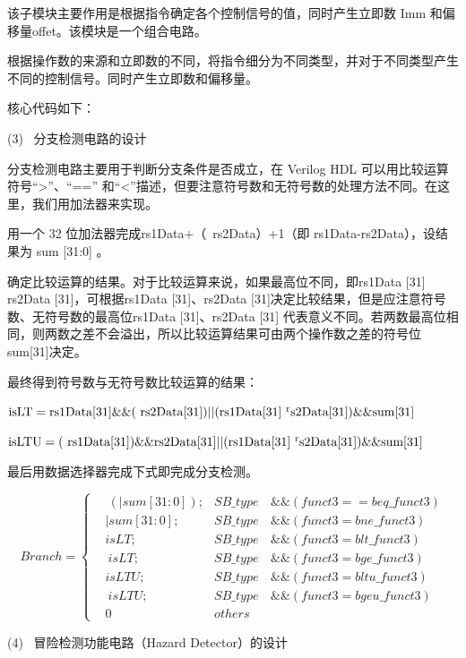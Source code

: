 \documentclass{../source/Experiment}
\begin{document}
        该子模块主要作用是根据指令确定各个控制信号的值，同时产生立即数 Imm 和偏移量offet。该模块是一个组合电路。

        根据操作数的来源和立即数的不同，将指令细分为不同类型，并对于不同类型产生不同的控制信号。同时产生立即数和偏移量。

        核心代码如下：

        (3) \, 分支检测电路的设计

        分支检测电路主要用于判断分支条件是否成立，在 Verilog HDL 可以用比较运算符号“>”、“==” 和“<”描述，但要注意符号数和无符号数的处理方法不同。在这里，我们用加法器来实现。

        用一个 32 位加法器完成rs1Data+（~rs2Data）+1（即 rs1Data-rs2Data），设结果为 sum [31:0] 。

        确定比较运算的结果。对于比较运算来说，如果最高位不同，即rs1Data [31]  rs2Data [31]，可根据rs1Data [31]、rs2Data [31]决定比较结果，但是应注意符号数、无符号数的最高位rs1Data [31]、rs2Data [31] 代表意义不同。若两数最高位相同，则两数之差不会溢出，所以比较运算结果可由两个操作数之差的符号位 sum[31]决定。

        最终得到符号数与无符号数比较运算的结果：

        $ \rm isLT=rs1Data[31]\&\&(~rs2Data[31]) || (rs1Data[31]~^rs2Data[31]) \&\& sum[31]$

        $ \rm isLTU= (~rs1Data[31] )\&\& rs2Data[31] || (rs1Data[31]~^rs2Data[31]) \&\& sum[31]$

        最后用数据选择器完成下式即完成分支检测。

        $$Branch = \left\{
            \begin{aligned}
             & ~ (| sum[31 : 0]); & SB\_type & \, \& \& (funct3 == beq\_funct3 )\\
             & | sum[31 : 0];  & SB\_type & \, \& \& (funct3 = bne\_funct3 )\\
             & isLT;  & SB\_type & \, \& \&(funct3 = blt\_funct3 )\\
             & ~ isLT ;  & SB\_type & \, \& \& (funct3 = bge\_funct3 )\\
             & isLTU ;  & SB\_type & \, \& \& (funct3 = bltu\_funct 3)\\
             & ~ isLTU ;  & SB\_type & \, \& \& (funct3 = bgeu\_funct3)\\
             & 0  & others  & 
            \end{aligned}\right.   
        $$

        (4) \, 冒险检测功能电路（Hazard Detector）的设计
\end{document}
